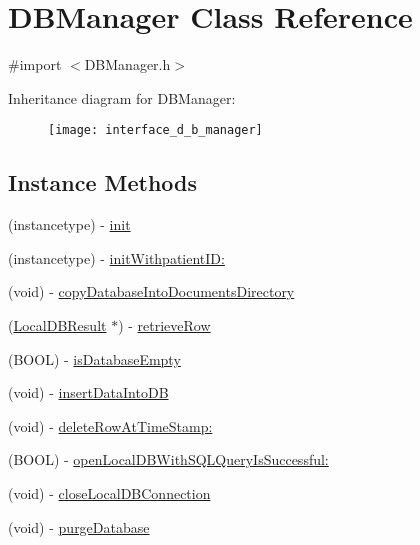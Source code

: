 \hypertarget{interface_d_b_manager}{\section{D\-B\-Manager Class Reference}
\label{interface_d_b_manager}
}


{\ttfamily \#import $<$D\-B\-Manager.\-h$>$}

Inheritance diagram for D\-B\-Manager\-:\begin{figure}[H]
\begin{center}
\leavevmode
\texttt{[image: interface\_d\_b\_manager]}
\end{center}
\end{figure}
\subsection*{Instance Methods}
\begin{DoxyCompactItemize}
\item 
(instancetype) -\/ \hyperlink{interface_d_b_manager_a0b390c8eab2577c30b2012e14ae821fe}{init}
\item 
(instancetype) -\/ \hyperlink{interface_d_b_manager_a24ba5578b7bcfff67ad5fcffb6c05f7b}{init\-Withpatient\-I\-D\-:}
\item 
(void) -\/ \hyperlink{interface_d_b_manager_a2e49fe020ebf348c2768a4c4a3dcff00}{copy\-Database\-Into\-Documents\-Directory}
\item 
(\hyperlink{interface_local_d_b_result}{Local\-D\-B\-Result} $\ast$) -\/ \hyperlink{interface_d_b_manager_ad6723b4f6b2191eddbcc4bb9bd361fcb}{retrieve\-Row}
\item 
(B\-O\-O\-L) -\/ \hyperlink{interface_d_b_manager_a3c424eba24e9894922714f6154a6dc44}{is\-Database\-Empty}
\item 
(void) -\/ \hyperlink{interface_d_b_manager_a0c354ea19fc86923ba33e5dc32798ca8}{insert\-Data\-Into\-D\-B}
\item 
(void) -\/ \hyperlink{interface_d_b_manager_a28d37edd37bc78b35579d276b8abfd9b}{delete\-Row\-At\-Time\-Stamp\-:}
\item 
(B\-O\-O\-L) -\/ \hyperlink{interface_d_b_manager_ab93660b0ab1caac6cd83b9edc349ddee}{open\-Local\-D\-B\-With\-S\-Q\-L\-Query\-Is\-Successful\-:}
\item 
(void) -\/ \hyperlink{interface_d_b_manager_a768157b5a58c4e400ee1326fe804d2b8}{close\-Local\-D\-B\-Connection}
\item 
(void) -\/ \hyperlink{interface_d_b_manager_aa804a3f4200ce732321d814cf86dbd2b}{purge\-Database}
\end{DoxyCompactItemize}
